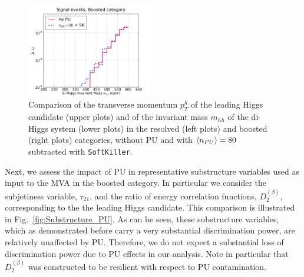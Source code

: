 \begin{figure}[t]
\begin{center}
  \includegraphics[width=0.49\textwidth]{plots/m_HH_C2_bst_comp.pdf}
  \caption{\small
    Comparison of the transverse momentum $p_T^h$ of the leading
    Higgs candidate (upper plots) and of the invariant mass $m_{hh}$
    of the di-Higgs system (lower plots) in the resolved
    (left plots) and boosted (right plots) categories,
    without PU and with $\left\langle n_{PU}\right\rangle=80$ subtracted with {\tt SoftKiller}.
}
\label{fig:mHH_PU}
\end{center}
\end{figure}

Next, we assess the impact of PU in representative
substructure variables
used as input to the MVA in the boosted category.
%
In particular we consider the subjetiness variable,
$\tau_{21}$, and the ratio
of energy correlation functions, $D_2^{(\beta)}$,
corresponding to the the leading Higgs candidate.
%
This comparison is illustrated in Fig.~\ref{fig:Substructure_PU}.
%
As can be seen, these substructure variables, which
as demonstrated before carry a very substantial
discrimination power, are relatively unaffected by PU.
%
Therefore, we do not expect a substantial loss of discrimination
power due to PU effects in our analysis.
%
Note in particular that $D_2^{(\beta)}$ was constructed to be resilient
with respect to PU contamination.


